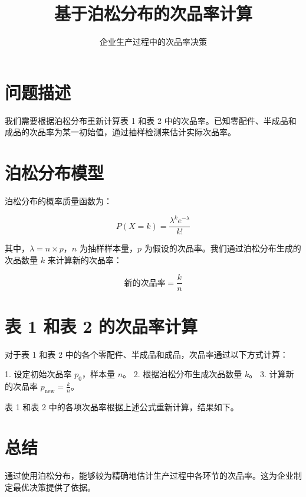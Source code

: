 \documentclass{article}
\title{基于泊松分布的次品率计算}
\author{企业生产过程中的次品率决策}
\date{}
\begin{document}
\maketitle

\section{问题描述}

我们需要根据泊松分布重新计算表 1 和表 2 中的次品率。已知零配件、半成品和成品的次品率为某一初始值，通过抽样检测来估计实际次品率。

\section{泊松分布模型}

泊松分布的概率质量函数为：

\[
    P(X = k) = \frac{\lambda^k e^{-\lambda}}{k!}
\]

其中，\( \lambda = n \times p \)，\( n \) 为抽样样本量，\( p \) 为假设的次品率。我们通过泊松分布生成的次品数量 \( k \) 来计算新的次品率：

\[
    \text{新的次品率} = \frac{k}{n}
\]

\section{表 1 和表 2 的次品率计算}

对于表 1 和表 2 中的各个零配件、半成品和成品，次品率通过以下方式计算：

1. 设定初始次品率 \( p_0 \)，样本量 \( n \)。
2. 根据泊松分布生成次品数量 \( k \)。
3. 计算新的次品率 \( p_{\text{new}} = \frac{k}{n} \)。

表 1 和表 2 中的各项次品率根据上述公式重新计算，结果如下。

\section{总结}

通过使用泊松分布，能够较为精确地估计生产过程中各环节的次品率。这为企业制定最优决策提供了依据。
\end{document}
